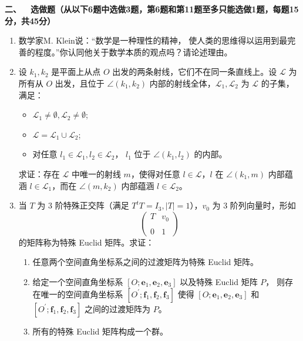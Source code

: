     \textbf{二、\ \ 选做题（从以下6题中选做3题，第6题和第11题至多只能选做1题，每题15分，共45分）}
    \begin{enumerate}
    \item 数学家M. Klein说：``数学是一种理性的精神，
    使人类的思维得以运用到最完善的程度。''你认同他关于数学本质的观点吗？请论述理由。
    \item 设 $k_1, k_2$ 是平面上从点 $O$ 出发的两条射线，它们不在同一条直线上。设 $\mathcal{L}$ 为所有从 $O$ 出发，且位于 $\angle(k_{1},k_{2})$ 内部的射线全体，$\mathcal{L}_{1},\mathcal{L}_{2}$ 为 $\mathcal{L}$ 的子集，满足：
    \begin{itemize}
        \item $\mathcal{L}_{1}\ne\emptyset, \mathcal{L}_{2}\ne\emptyset$;
        \item $\mathcal{L}=\mathcal{L}_{1}\cup\mathcal{L}_{2}$;
        \item 对任意 $l_1 \in \mathcal{L}_{1}, l_{2}\in\mathcal{L}_{2}$， $l_{1}$ 位于 $\angle(k_{1},l_{2})$ 的内部。
    \end{itemize}
    求证：存在 $\mathcal{L}$ 中唯一的射线 $m$，使得对任意 $l\in\mathcal{L}$，$l$ 在 $\angle(k_{1},m)$ 内部蕴涵 $l\in\mathcal{L}_{1}$，而在 $\angle(m,k_{2})$ 内部蕴涵 $l\in\mathcal{L}_{2}$。

    \item 当 $T$ 为 $3$ 阶特殊正交阵（满足 $T^{t}T=I_{3}, |T|=1$），$v_{0}$ 为 $3$ 阶列向量时，形如
    \[ \begin{pmatrix} T & v_{0} \\ \\ 0 & 1 \end{pmatrix} \]
    的矩阵称为特殊 Euclid 矩阵。求证：
    \begin{enumerate}
        \item[(a)] 任意两个空间直角坐标系之间的过渡矩阵为特殊 Euclid 矩阵。
        \item[(b)] 给定一个空间直角坐标系 $[O;\boldsymbol{e}_{1},\boldsymbol{e}_{2},\boldsymbol{e}_{3}]$ 以及特殊 Euclid 矩阵 $P$，
        则存在唯一的空间直角坐标系 $[O^{\prime};\boldsymbol{f}_{\!1},\boldsymbol{f}_{\!2},\boldsymbol{f}_{\!3}]$ 
        使得 $[O;\boldsymbol{e}_{1},\boldsymbol{e}_{2},\boldsymbol{e}_{3}]$ 和 $[O^{\prime};\boldsymbol{f}_{\!1},\boldsymbol{f}_{\!2},\boldsymbol{f}_{\!3}]$ 之间的过渡矩阵为 $P$。
        \item[(c)] 所有的特殊 Euclid 矩阵构成一个群。
    \end{enumerate}


\end{enumerate}
